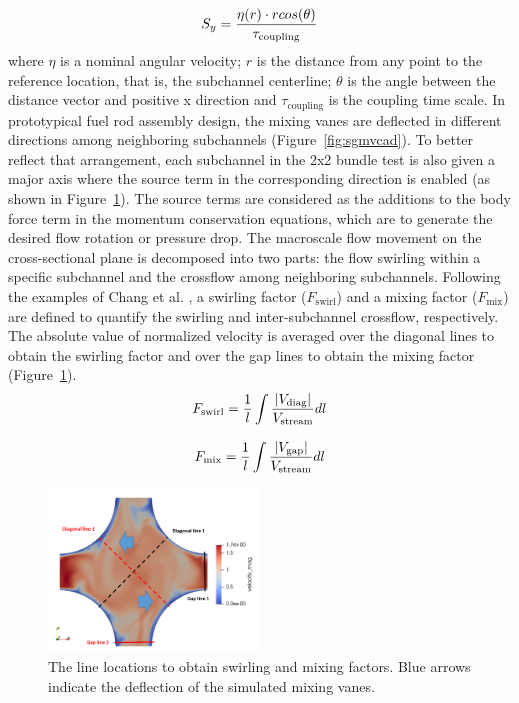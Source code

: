 \begin{equation}
  S_y = \frac{\eta(r)\cdot r cos(\theta)}{\tau_\text{coupling}}\\
\end{equation}
where $\eta$ is a nominal angular velocity;
$r$ is the distance from any point to the reference location, that is, the subchannel centerline;
$\theta$ is the angle between the distance vector and positive x direction and
$\tau_\text{coupling}$ is the coupling time scale.
In prototypical fuel rod assembly design, the mixing vanes are deflected in different directions among neighboring subchannels (Figure~\ref{fig:sgmvcad}).
To better reflect that arrangement, each subchannel in the 2x2 bundle test is also given a major axis where the source term in the corresponding direction is enabled (as shown in Figure~\ref{fig:sblines}).
The source terms are considered as the additions to the body force term in the momentum conservation equations, which are to generate the desired flow rotation or pressure drop.
The macroscale flow movement on the cross-sectional plane is decomposed into two parts: the flow swirling within a specific subchannel and the crossflow among neighboring subchannels.
Following the examples of Chang et al. \cite{Chang2014},
a swirling factor ($F_\text{swirl}$) and a mixing factor ($F_\text{mix}$) are defined to quantify the swirling and inter-subchannel crossflow, respectively.
The absolute value of normalized velocity is averaged over the diagonal lines to obtain the swirling factor and over the gap lines to obtain the mixing factor (Figure~\ref{fig:sblines}).
\begin{equation}
  F_\text{swirl} = \frac{1}{l}\int\frac{\left| V_\text{diag} \right|}{V_\text{stream}}dl\\
\end{equation}

\begin{equation}
  F_\text{mix} = \frac{1}{l}\int\frac{\left| V_\text{gap} \right|}{V_\text{stream}}dl\\
\end{equation}

\begin{figure}[!ht]
\centering
\includegraphics[width=0.5\textwidth]{./figures/Analysis_locations_in_a_subchannel.png}
\caption{The line locations to obtain swirling and mixing factors. Blue arrows indicate the deflection of the simulated mixing vanes. }
\label{fig:sblines}
\end{figure}

